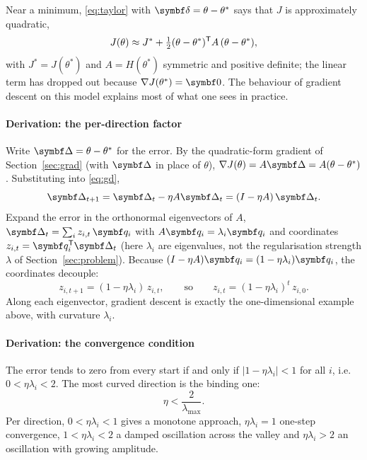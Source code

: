 \documentclass[11pt]{article}
\newcommand{\dvec}{\vect{\delta}}
\newcommand{\errv}{\vect{\Delta}}
\newcommand{\qvec}{\vect{q}}
\begin{document}
Near a minimum, \eqref{eq:taylor} with $\dvec = \theta - \theta^*$ says that $J$ is approximately quadratic,
\[
  J(\theta) \approx J^* + \tfrac12 (\theta - \theta^*)^{\mathsf{T}} A\, (\theta - \theta^*) ,
\]
with $J^* = J(\theta^*)$ and $A = H(\theta^*)$ symmetric and positive definite; the linear term has dropped out
because $\nabla J(\theta^*) = \vect{0}$. The behaviour of gradient descent on this model explains most
of what one sees in practice.

\paragraph{Derivation: the per-direction factor} Write $\errv = \theta - \theta^*$ for the error. By the quadratic-form
gradient of Section~\ref{sec:grad} (with $\errv$ in place of $\theta$), $\nabla J(\theta) = A\errv = A(\theta - \theta^*)$.
Substituting into \eqref{eq:gd},
\[
  \errv_{t+1} = \errv_t - \eta A\errv_t = (I - \eta A)\,\errv_t .
\]
Expand the error in the orthonormal eigenvectors of $A$, $\errv_t = \sum_i z_{i,t}\,\qvec_i$ with
$A\qvec_i = \lambda_i\qvec_i$ and coordinates $z_{i,t} = \qvec_i\T\errv_t$ (here $\lambda_i$ are eigenvalues, not the regularisation strength $\lambda$ of
Section~\ref{sec:problem}). Because $(I - \eta A)\qvec_i = (1 - \eta\lambda_i)\qvec_i$, the coordinates decouple:
\[
  z_{i,t+1} = (1 - \eta\lambda_i)\, z_{i,t}, \qquad\text{so}\qquad z_{i,t} = (1 - \eta\lambda_i)^t\, z_{i,0} .
\]
Along each eigenvector, gradient descent is exactly the one-dimensional example above, with curvature $\lambda_i$.

\paragraph{Derivation: the convergence condition} The error tends to zero from every start if and only if
$|1 - \eta\lambda_i| < 1$ for all $i$, i.e.\ $0 < \eta\lambda_i < 2$. The most curved direction is the binding one:
\begin{equation}\label{eq:stability}
  \eta < \frac{2}{\lambda_{\max}} .
\end{equation}
Per direction, $0 < \eta\lambda_i < 1$ gives a monotone approach, $\eta\lambda_i = 1$ one-step convergence,
$1 < \eta\lambda_i < 2$ a damped oscillation across the valley and $\eta\lambda_i > 2$ an oscillation with growing
amplitude.
\end{document}
